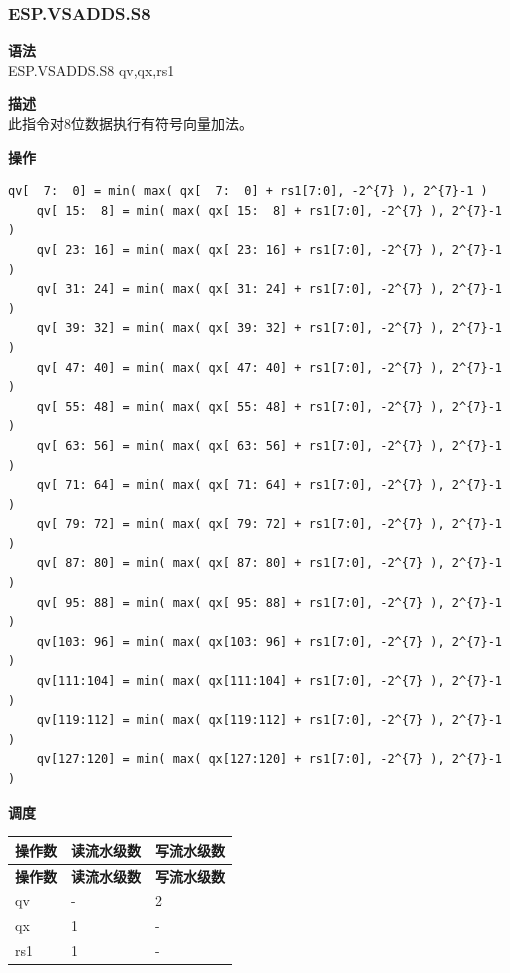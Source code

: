 \newpage
\subsubsection{ESP.VSADDS.S8}\label{instruction:ESPVSADDSS8}
\textbf{语法}\\
ESP.VSADDS.S8 qv,qx,rs1

\textbf{描述}\\
此指令对8位数据执行有符号向量加法。

\textbf{操作}\\
\begin{lstlisting}[escapeinside=`?]
    qv[  7:  0] = min( max( qx[  7:  0] + rs1[7:0], -2^{7} ), 2^{7}-1 )
    qv[ 15:  8] = min( max( qx[ 15:  8] + rs1[7:0], -2^{7} ), 2^{7}-1 )
    qv[ 23: 16] = min( max( qx[ 23: 16] + rs1[7:0], -2^{7} ), 2^{7}-1 )
    qv[ 31: 24] = min( max( qx[ 31: 24] + rs1[7:0], -2^{7} ), 2^{7}-1 )
    qv[ 39: 32] = min( max( qx[ 39: 32] + rs1[7:0], -2^{7} ), 2^{7}-1 )
    qv[ 47: 40] = min( max( qx[ 47: 40] + rs1[7:0], -2^{7} ), 2^{7}-1 )
    qv[ 55: 48] = min( max( qx[ 55: 48] + rs1[7:0], -2^{7} ), 2^{7}-1 )
    qv[ 63: 56] = min( max( qx[ 63: 56] + rs1[7:0], -2^{7} ), 2^{7}-1 )
    qv[ 71: 64] = min( max( qx[ 71: 64] + rs1[7:0], -2^{7} ), 2^{7}-1 )
    qv[ 79: 72] = min( max( qx[ 79: 72] + rs1[7:0], -2^{7} ), 2^{7}-1 )
    qv[ 87: 80] = min( max( qx[ 87: 80] + rs1[7:0], -2^{7} ), 2^{7}-1 )
    qv[ 95: 88] = min( max( qx[ 95: 88] + rs1[7:0], -2^{7} ), 2^{7}-1 )
    qv[103: 96] = min( max( qx[103: 96] + rs1[7:0], -2^{7} ), 2^{7}-1 )
    qv[111:104] = min( max( qx[111:104] + rs1[7:0], -2^{7} ), 2^{7}-1 )
    qv[119:112] = min( max( qx[119:112] + rs1[7:0], -2^{7} ), 2^{7}-1 )
    qv[127:120] = min( max( qx[127:120] + rs1[7:0], -2^{7} ), 2^{7}-1 )
\end{lstlisting}

\textbf{调度}\\
\begin{longtable}[c]{|l|l|l|}
    \hline
    \rowcolor{lightgray}
    \textbf{操作数} & \textbf{读流水级数} & \textbf{写流水级数} \\\hline
    \endfirsthead
    \hline
    \rowcolor{lightgray}
     \textbf{操作数} & \textbf{读流水级数} & \textbf{写流水级数} \\\hline
    \endhead
    \hline
    \endfoot

  qv & - & 2 \\\hline
    qx & 1 & - \\\hline
    rs1 & 1 & -

\end{longtable}


